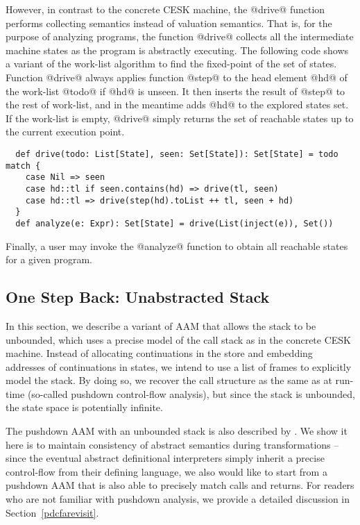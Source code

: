 \documentclass[acmsmall, screen]{acmart}\settopmatter{}
\begin{document}
However, in contrast to the concrete CESK machine, the @drive@ function performs
collecting semantics instead of valuation semantics. That is, for the purpose of
analyzing programs, the function @drive@ collects all the intermediate machine states
as the program is abstractly executing. The following code shows a variant of the
work-list algorithm to find the fixed-point of the set of states.
Function @drive@ always applies function @step@ to the head element @hd@ of
the work-list @todo@ if @hd@ is unseen. It then inserts the result of @step@ to
the rest of work-list, and in the meantime adds @hd@ to the explored states set.
If the work-list is empty, @drive@ simply returns the set of reachable states
up to the current execution point.

\begin{lstlisting}
  def drive(todo: List[State], seen: Set[State]): Set[State] = todo match {
    case Nil => seen
    case hd::tl if seen.contains(hd) => drive(tl, seen)
    case hd::tl => drive(step(hd).toList ++ tl, seen + hd)
  }
  def analyze(e: Expr): Set[State] = drive(List(inject(e)), Set())
\end{lstlisting}

Finally, a user may invoke the @analyze@ function to obtain all reachable states for
a given program.


\subsection{One Step Back: Unabstracted Stack} \label{unabs}

In this section, we describe a variant of AAM that allows the stack to be unbounded,
which uses a precise model of the call stack as in the concrete CESK machine.
Instead of allocating continuations in the store and embedding addresses of
continuations in states, we intend to use a list of frames to explicitly model
the stack. By doing so, we recover the call structure as the same as at run-time
(so-called pushdown control-flow analysis), but since the stack is unbounded,
the state space is potentially infinite.

The pushdown AAM with an unbounded stack is also described by \citet{van2012systematic}.
We show it here is to maintain consistency of abstract semantics during
transformations -- since the eventual abstract definitional interpreters simply inherit
a precise control-flow from their defining language, we also would like to start from a
pushdown AAM that is also able to precisely match calls and returns.
For readers who are not familiar with pushdown analysis, we provide a detailed discussion
in Section~\ref{pdcfarevisit}.
\end{document}
